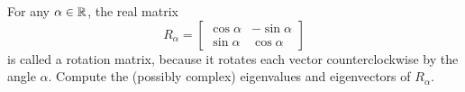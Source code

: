 \begin{exercise}
  \label{ex:hw06:rotation-eigenvalues}
  For any \(\alpha\in\mathbb{R}\), the real matrix
  \[
    R_\alpha=\begin{bmatrix}
      \cos\alpha&-\sin\alpha\\
      \sin\alpha&\cos\alpha
    \end{bmatrix}
  \]
  is called a rotation matrix, because it rotates each vector counterclockwise
  by the angle \(\alpha\). Compute the (possibly complex) eigenvalues and
  eigenvectors of \(R_\alpha\).
\end{exercise}
